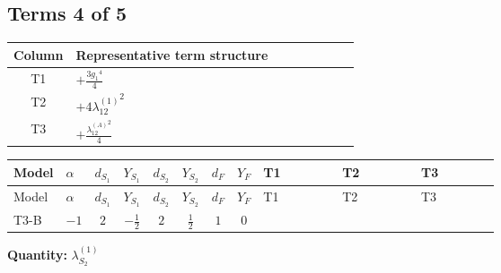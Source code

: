 \documentclass[8pt]{article}
\begin{document}
\begin{landscape}
\subsection*{Terms 4 of 5}
\begin{center}
\begin{tabular}{@{}c >{\raggedright\arraybackslash}p{0.82\linewidth}@{}}
\toprule
Column & Representative term structure \\
\midrule
T1 & \(\displaystyle +\frac{3 {g_1}^4}{4}\) \\
\midrule
T2 & \(\displaystyle +4 {\lambda_{12}^{(1)}}^2\) \\
\midrule
T3 & \(\displaystyle +\frac{{\lambda_{12}^{(A)}}^2}{4}\) \\
\midrule
\bottomrule
\end{tabular}
\end{center}
\smallskip
\tiny
\begin{longtable}{@{}llcccccc >{\raggedright\arraybackslash}p{0.21\linewidth} >{\raggedright\arraybackslash}p{0.21\linewidth} >{\raggedright\arraybackslash}p{0.21\linewidth}@{}}
\toprule
Model & $\alpha$ & $d_{S_1}$ & $Y_{S_1}$ & $d_{S_2}$ & $Y_{S_2}$ & $d_F$ & $Y_F$ & T1 & T2 & T3 \\
\midrule
\endfirsthead
\toprule
Model & $\alpha$ & $d_{S_1}$ & $Y_{S_1}$ & $d_{S_2}$ & $Y_{S_2}$ & $d_F$ & $Y_F$ & T1 & T2 & T3 \\
\midrule
\endhead
T3-B & $-1$ & $2$ & $-\frac{1}{2}$ & $2$ & $\frac{1}{2}$ & $1$ & $0$ & \scriptsize\adjustbox{max width=\linewidth}{$\begin{gathered} +\frac{3 {g_1}^4}{4}\end{gathered}$} & \scriptsize\adjustbox{max width=\linewidth}{$\begin{gathered} +4 {\lambda_{12}^{(1)}}^2\end{gathered}$} & \scriptsize\adjustbox{max width=\linewidth}{$\begin{gathered} +\frac{{\lambda_{12}^{(A)}}^2}{4}\end{gathered}$} \\
\midrule
\bottomrule
\end{longtable}
\clearpage
\noindent\textbf{Quantity: }$\lambda_{S_2}^{(1)}$\par\smallskip

\end{landscape}
\end{document}
